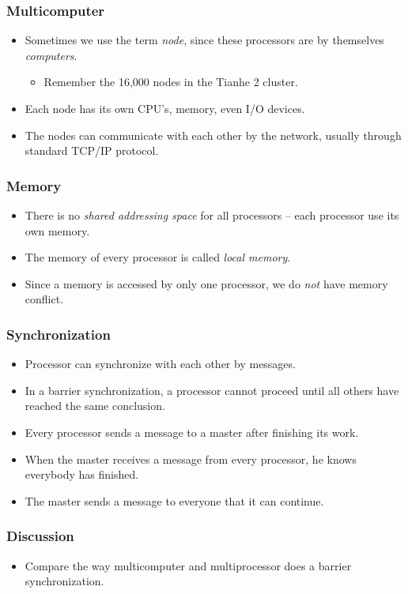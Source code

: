 \documentclass{beamer}
\begin{document}
\begin{CJK}{UTF8}{bsmi}
\begin{frame}
\frametitle{Multicomputer}
\begin{itemize}
\item Sometimes we use the term {\em node}, since these processors are
  by themselves {\em computers}.
  \begin{itemize}
    \item Remember the 16,000 nodes in the Tianhe 2 cluster.
  \end{itemize}
\item Each node has its own CPU's, memory, even I/O devices.
\item The nodes can communicate with each other by the network, usually
  through standard TCP/IP protocol.
\end{itemize}
\end{frame}


\begin{frame}
\frametitle{Memory}
\begin{itemize}
\item There is no {\em shared addressing space} for all processors --
  each processor use its own memory.
\item The memory of every processor is called {\em local memory}.
\item Since a memory is accessed by only one processor, we do {\em
  not} have memory conflict.
\end{itemize}
\end{frame}

\begin{frame}
\frametitle{Synchronization}
\begin{itemize}
\item Processor can synchronize with each other by messages.
\item In a barrier synchronization, a processor cannot proceed until
  all others have reached the same conclusion.
\item Every processor sends a message to a master after finishing its work.
\item When the master receives a message from every processor, he knows everybody has finished.
\item The master sends a message to everyone that it can continue.
\end{itemize}
\end{frame}

\begin{frame}
\frametitle{Discussion}
\begin{itemize}
\item Compare the way multicomputer and multiprocessor does a barrier
 synchronization.
\end{itemize}
\end{frame}




\end{CJK}
\end{document}
